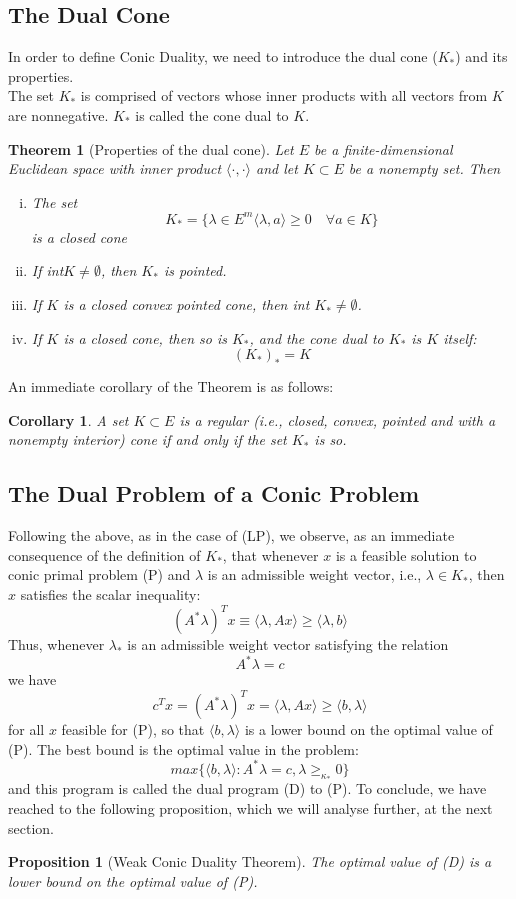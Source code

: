 \documentclass[12pt]{article}
\newtheorem*{theorem}{Theorem}
\newtheorem*{corollary}{Corollary}
\newtheorem*{proposition}{Proposition}
\begin{document}
    \subsection{The Dual Cone}
    In order to define Conic Duality, we need to introduce the dual cone ($K_*$) and its properties. \\
 	The set $K_*$ is comprised of vectors whose inner products with all vectors from $K$ are nonnegative. $K_*$ is called the cone dual to $K$. \\
 	\begin{theorem}[Properties of the dual cone] Let $E$ be a finite-dimensional Euclidean space with inner product $\langle \cdot, \cdot \rangle$ and let $K \subset E$ be a nonempty set. Then
 		\begin{enumerate}[(i)]
			\item The set $$K_* = \{ \lambda \in E^m \langle \lambda , a \rangle \geq 0 \quad \forall a \in K \}$$is a closed cone 		
 			\item If int$K \neq \emptyset $, then $K_*$ is pointed.
 			\item If $K$ is a closed convex pointed cone, then int $K_* \neq \emptyset$.
 			\item If $K$ is a closed cone, then so is $K_*$, and the cone dual to $K_*$ is $K$ itself:
 			$$(K_*)_* = K$$
 		\end{enumerate}
 	\end{theorem} 
 	An immediate corollary of the Theorem is as follows:
 	\begin{corollary}
 	 A set $K \subset E$ is a regular (i.e., closed, convex, pointed and with a nonempty interior) cone if and only if the set $K_*$ is so.
 	\end{corollary} \newpage
 	\subsection{The Dual Problem of a Conic Problem}
 	Following the above, as in the case of (LP), we observe, as an immediate consequence of the definition of $K_*$, that whenever $x$ is a feasible solution to conic primal problem (P) and $\lambda$ is an admissible weight vector, i.e., $\lambda \in K_*$, then $x$ satisfies the scalar inequality:
 	$$(A^* \lambda)^T x \equiv \langle \lambda, Ax \rangle \geq \langle \lambda, b \rangle $$
 	Thus, whenever $\lambda_*$ is an admissible weight vector satisfying the relation $$A^*\lambda = c $$
 	we have 
 	$$c^Tx = (A^*\lambda)^T x = \langle \lambda, Ax \rangle \geq \langle b, \lambda \rangle $$
 	for all $x$ feasible for (P), so that $\langle b, \lambda \rangle$ is a lower bound on the optimal value of (P). The best bound is the optimal value in the problem:
 	$$max\{ \langle b, \lambda \rangle: A^* \lambda = c, \lambda \geq_{\kappa_*} 0  \}$$
 	and this program is called the dual program (D) to (P). 
 	To conclude, we have reached to the following proposition, which we will analyse further, at the next section.
 	\begin{proposition}
 	[Weak Conic Duality Theorem] The optimal value of (D) is a lower bound on the optimal value of (P).
 	\end{proposition}
 	
\end{document}
